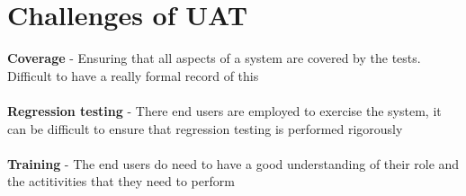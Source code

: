 \documentclass{article}[18pt]
\begin{document}
\section{Challenges of UAT}
\textbf{Coverage} - Ensuring that all aspects of a system are covered by the tests. Difficult to have a really formal record of this\\
\\
\textbf{Regression testing} - There end users are employed to exercise the system, it can be difficult to ensure that regression testing is performed rigorously\\
\\
\textbf{Training} - The end users do need to have a good understanding of their role and the actitivities that they need to perform
\end{document}
